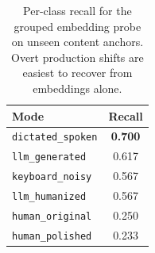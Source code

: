 \begin{table}[t]
    \centering
    \caption{Per-class recall for the grouped embedding probe on unseen content anchors. Overt production shifts are easiest to recover from embeddings alone.}
    \label{tab:probe_recall}
    \begin{tabular}{@{}lc@{}}
        \toprule
        Mode & Recall \\
        \midrule
        \texttt{dictated\_spoken} & \textbf{0.700} \\
        \texttt{llm\_generated} & 0.617 \\
        \texttt{keyboard\_noisy} & 0.567 \\
        \texttt{llm\_humanized} & 0.567 \\
        \texttt{human\_original} & 0.250 \\
        \texttt{human\_polished} & 0.233 \\
        \bottomrule
    \end{tabular}
\end{table}
